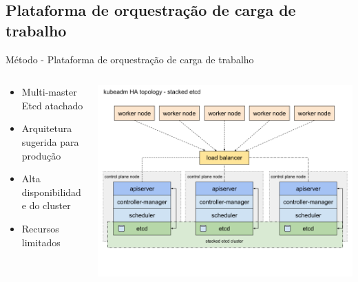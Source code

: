 \documentclass[10pt,brazil]{beamer}
\theoremstyle{definition}
\begin{document}
\subsection{Plataforma de orquestração de carga de trabalho}

\begin{frame}{Método - Plataforma de orquestração de carga de trabalho}
  \begin{columns}
    \begin{column}{0.5\textwidth}
      \begin{itemize}
        \item Multi-master Etcd atachado %
        \item Arquitetura sugerida para produção
        \item Alta disponibilidade do cluster
        \item Recursos limitados
      \end{itemize}
    \end{column}
    \begin{column}{0.5\textwidth}  %
      \begin{center}
        \includegraphics[width=1\textwidth]{kubeadm-ha-topology-stacked-etcd.png}
      \end{center}
    \end{column}
  \end{columns}
\end{frame}
\end{document}
